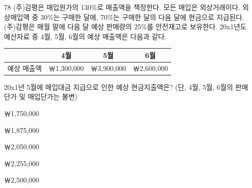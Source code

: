 \begin{question}{78}
(주)감평은 매입원가의 130\%로 매출액을 책정한다. 모든 매입은 외상거래이다. 외상매입액 중 30\%는 구매한 달에, 70\%는 구매한 달의 다음 달에 현금으로 지급된다. (주)감평은 매월 말에 다음 달 예상 판매량의 25\%를 안전재고로 보유한다. 20x1년도 예산자료 중 4월, 5월, 6월의 예상 매출액은 다음과 같다.
\par{\small\centering\begin{tabular}{|l|c|c|c|}
\hline
 & 4월 & 5월 & 6월 \\ \hline
예상 매출액 & ￦1,300,000 & ￦3,900,000 & ￦2,600,000 \\ \hline
\end{tabular}\par}
20x1년 5월에 매입대금 지급으로 인한 예상 현금지출액은? (단, 4월, 5월, 6월의 판매단가 및 매입단가는 불변) \par
\begin{choices}
  \item ￦1,750,000
  \item ￦1,875,000
  \item ￦2,050,000
  \item ￦2,255,000
  \item ￦2,500,000
\end{choices}
\end{question}
